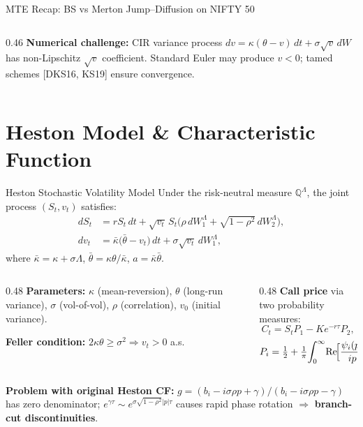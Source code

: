 \documentclass[10pt, aspectratio=169]{beamer}
\DeclareMathOperator{\re}{Re}
\begin{document}
\begin{frame}{MTE Recap: BS vs Merton Jump--Diffusion on NIFTY 50}
\begin{columns}[T]
\begin{column}{0.46\textwidth}
\textbf{Numerical challenge:} CIR variance process $dv = \kappa(\theta{-}v)\,dt + \sigma\sqrt{v}\,dW$ has non-Lipschitz $\sqrt{v}$ coefficient. Standard Euler may produce $v<0$; tamed schemes [DKS16, KS19] ensure convergence.
\end{column}
\end{columns}
\end{frame}

\section{Heston Model \& Characteristic Function}

\begin{frame}{Heston Stochastic Volatility Model}
Under the risk-neutral measure $\mathbb{Q}^\Lambda$, the joint process $(S_t, v_t)$ satisfies:
\begin{align}
  dS_t &= rS_t\,dt + \sqrt{v_t}\,S_t\bigl(\rho\,dW_1^{\Lambda} + \sqrt{1-\rho^2}\,dW_2^{\Lambda}\bigr), \label{eq:heston_S}\\[2pt]
  dv_t &= \bar\kappa\bigl(\bar\theta - v_t\bigr)\,dt + \sigma\sqrt{v_t}\,dW_1^{\Lambda}, \label{eq:heston_v}
\end{align}
where $\bar\kappa = \kappa + \sigma\Lambda$, \; $\bar\theta = \kappa\theta / \bar\kappa$, \; $a = \bar\kappa\bar\theta$.

\vspace{3pt}
\begin{columns}[T]
\begin{column}{0.48\textwidth}
\textbf{Parameters:} $\kappa$ (mean-reversion), $\theta$ (long-run variance), $\sigma$ (vol-of-vol), $\rho$ (correlation), $v_0$ (initial variance).

\textbf{Feller condition:} $2\kappa\theta \geq \sigma^2 \Rightarrow v_t > 0$ a.s.
\end{column}
\begin{column}{0.48\textwidth}
\textbf{Call price} via two probability measures:
\[
  C_t = S_t P_1 - K e^{-r\tau} P_2,
\]
\[
  P_i = \tfrac{1}{2} + \tfrac{1}{\pi}\!\int_0^\infty \!\re\!\Bigl[\frac{\psi_i(p)}{ip}\Bigr]dp.
\]
\end{column}
\end{columns}
\vspace{3pt}
\textbf{Problem with original Heston CF:} $g = (b_i - i\sigma\rho p + \gamma)/(b_i - i\sigma\rho p - \gamma)$ has zero denominator; $e^{\gamma\tau} \sim e^{\sigma\sqrt{1-\rho^2}|p|\tau}$ causes rapid phase rotation $\Rightarrow$ \textbf{branch-cut discontinuities}.
\end{frame}
\end{document}
